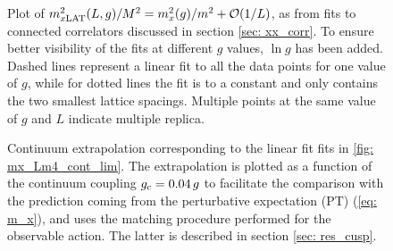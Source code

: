 %
%
%
\begin{figure}
\centering

\caption{Plot of $m_{x\rm LAT}^{2}(L,g)/M^{2}= m_{x}^{2}(g)/m^{2}+\mathcal{O}(1/L)$, as from fits to connected correlators discussed in section \ref{sec: xx_corr}. To ensure better visibility of the fits at different $g$ values, $\ln g$ has been added. Dashed lines represent a linear fit to all the data points for one value of $g$, while for dotted lines the fit is to a constant and only contains the two smallest lattice spacings. Multiple points at the same value of $g$ and $L$ indicate multiple replica.
\label{fig: mx_Lm4_cont_lim}}
\end{figure}
%
%
%
\begin{figure}
\centering

\caption{Continuum extrapolation corresponding to the linear fit fits in \autoref{fig: mx_Lm4_cont_lim}. The extrapolation is plotted as a function of the continuum coupling $g_{\rm c}=0.04\,g$ to facilitate the comparison with the prediction coming from the perturbative expectation (PT) (\ref{eq: m_x}), and uses the matching procedure performed for the observable action. The latter is described in section \ref{sec: res_cusp}.
\label{fig: mx_vs_g_Lm4}}
\end{figure}
%
%
%
%

